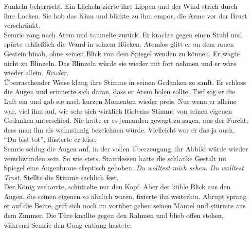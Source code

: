 Funkeln beherrscht. Ein Lächeln zierte ihre Lippen und der Wind strich durch ihre Locken. Sie hob 
das Kinn und blickte zu ihm empor, die Arme vor der Brust verschränkt. \\
Semric rang nach Atem und taumelte zurück. Er krachte gegen einen Stuhl und spürte schließlich die 
Wand in seinem Rücken. Atemlos glitt er an dem rauen Gestein hinab, ohne seinen Blick von dem 
Spiegel wenden zu können. Er wagte nicht zu Blinzeln. Das Blinzeln würde sie wieder mit fort nehmen 
und er wäre wieder allein. \textit{Bruder.}\\
Überraschender Weise klang ihre Stimme in seinen Gedanken so sanft. Er schloss die Augen und 
erinnerte sich daran, dass er Atem holen sollte. Tief sog er die Luft ein und gab sie nach kurzen 
Momenten wieder preis. Nur wenn er alleine war, viel ihm auf, wie sehr sich wirklich Rioleans 
Stimme von seinen eigenen Gedanken unterschied. Nie hatte er es jemanden gewagt zu sagen, aus der 
Furcht, dass man ihn als wahnsinnig bezeichnen würde. Vielleicht war er das ja auch.\\
``Du bist tot'', flüsterte er leise.\\
Semric schlug die Augen auf, in der vollen Überzeugung, ihr Abbild würde wieder verschwunden sein. 
So wie stets. Stattdessen hatte die schlanke Gestalt im Spiegel eine Augenbraue skeptisch gehoben. 
\textit{Du wolltest mich sehen. Du wolltest Trost.} Stellte die Stimme sachlich fest. \\
Der König verharrte, schüttelte nur den Kopf. Aber der kühle Blick aus den Augen, die seinen 
eigenen so ähnlich waren, fixierte ihn weiterhin. Abrupt sprang er auf die Beine, griff sich noch 
im vorüber gehen seinen Mantel und stürmte aus dem Zimmer. Die Türe knallte gegen den Rahmen und 
blieb offen stehen, während Semric den Gang entlang hastete.\\

